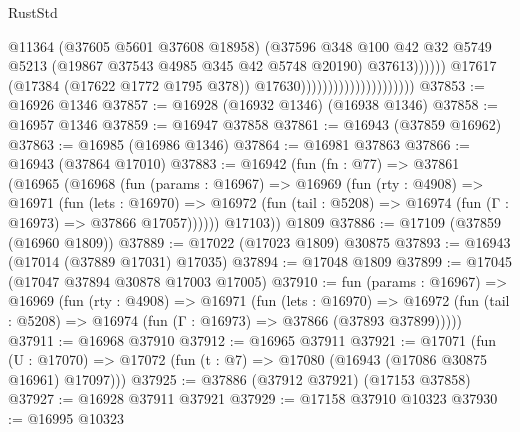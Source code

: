 \begin{lexlean}{RustStd}
\begin{coremodule}
                                                        @11364
                                                        (@37605 @5601 @37608 @18958)
                                                        (@37596
                                                          @348
                                                          @100
                                                          @42
                                                          @32
                                                          @5749
                                                          @5213
                                                          (@19867
                                                            @37543
                                                            @4985
                                                            @345
                                                            @42
                                                            @5748
                                                            @20190)
                                                          @37613))))))
                                              @17617
                                              (@17384 (@17622 @1772 @1795 @378))
                                              @17630)))))))))))))))))))))
@37853 := @16926 @1346
@37857 := @16928 (@16932 @1346) (@16938 @1346)
@37858 := @16957 @1346
@37859 := @16947 @37858
@37861 := @16943 (@37859 @16962)
@37863 := @16985 (@16986 @1346)
@37864 := @16981 @37863
@37866 := @16943 (@37864 @17010)
@37883 := @16942
    (fun (fn : @77) =>
    @37861
      (@16965
        (@16968
          (fun (params : @16967) =>
          @16969
            (fun (rty : @4908) =>
            @16971
              (fun (lets : @16970) =>
              @16972 (fun (tail : @5208) => @16974 (fun (Γ : @16973) => @37866 @17057))))))
        @17103))
    @1809
@37886 := @17109 (@37859 (@16960 @1809))
@37889 := @17022 (@17023 @1809) @30875
@37893 := @16943 (@17014 (@37889 @17031) @17035)
@37894 := @17048 @1809
@37899 := @17045 (@17047 @37894 @30878 @17003 @17005)
@37910 := fun (params : @16967) =>
  @16969
    (fun (rty : @4908) =>
    @16971
      (fun (lets : @16970) =>
      @16972 (fun (tail : @5208) => @16974 (fun (Γ : @16973) => @37866 (@37893 @37899)))))
@37911 := @16968 @37910
@37912 := @16965 @37911
@37921 := @17071
    (fun (U : @17070) => @17072 (fun (t : @7) => @17080 (@16943 (@17086 @30875 @16961) @17097)))
@37925 := @37886 (@37912 @37921) (@17153 @37858)
@37927 := @16928 @37911 @37921
@37929 := @17158 @37910 @10323
@37930 := @16995 @10323

\end{coremodule}
\end{lexlean}
